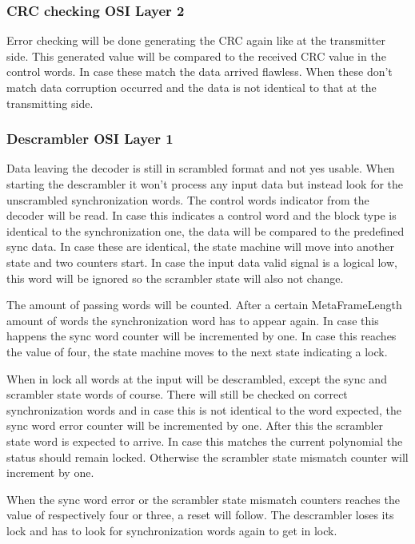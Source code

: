 	\subsubsection[CRC checking]{CRC checking \hfill OSI Layer 2}
		Error checking will be done generating the CRC again like at the transmitter side. This generated value will be compared to the received CRC value in the control words. In case these match the data arrived flawless. When these don't match data corruption occurred and the data is not identical to that at the transmitting side.

	\subsubsection[Descrambler]{Descrambler \hfill OSI Layer 1}
		Data leaving the decoder is still in scrambled format and not yes usable. When starting the descrambler it won't process any input data but instead look for the unscrambled synchronization words. The control words indicator from the decoder will be read. In case this indicates a control word and the block type is identical to the synchronization one, the data will be compared to the predefined sync data. In case these are identical, the state machine will move into another state and two counters start. In case the input data valid signal is a logical low, this word will be ignored so the scrambler state will also not change.
		
		The amount of passing words will be counted. After a certain MetaFrameLength amount of words the synchronization word has to appear again. In case this happens the sync word counter will be incremented by one. In case this reaches the value of four, the state machine moves to the next state indicating a lock.
		
		When in lock all words at the input will be descrambled, except the sync and scrambler state words of course. There will still be checked on correct synchronization words and in case this is not identical to the word expected, the sync word error counter will be incremented by one. After this the scrambler state word is expected to arrive. In case this matches the current polynomial the status should remain locked. Otherwise the scrambler state mismatch counter will increment by one. 
		
		When the sync word error or the scrambler state mismatch counters reaches the value of respectively four or three, a reset will follow. The descrambler loses its lock and has to look for synchronization words again to get in lock.
		
